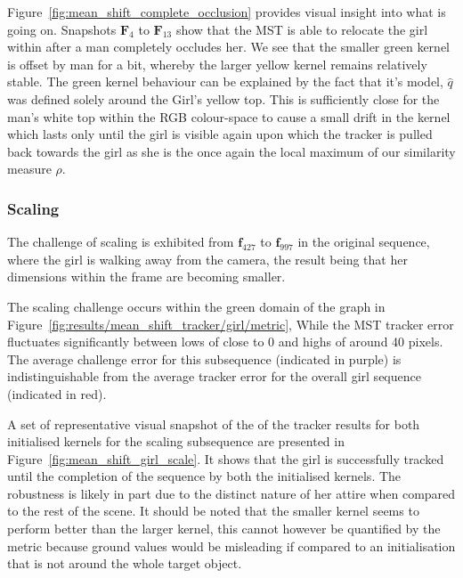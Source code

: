 Figure~\ref{fig:mean_shift_complete_occlusion} provides visual insight into
what is going on. Snapshots $\mathbf{F}_4$ to $\mathbf{F}_{13}$ show that the
MST is able to relocate the girl within after a man completely occludes her. We
see that the smaller green kernel is offset by man for a bit, whereby the larger
yellow kernel remains relatively stable. The green kernel behaviour can be
explained by the fact that it's model, $\hat{q}$ was defined solely around the
Girl's yellow top. This is sufficiently close for the man's white top within the
RGB colour-space to cause a small drift in the kernel which lasts only until the
girl is visible again upon which the tracker is pulled back towards the girl as
she is the once again the local maximum of our similarity measure $\rho$.

\subsubsection{Scaling}
The challenge of scaling is exhibited from $\mathbf{f}_{427}$ to
$\mathbf{f}_{997}$ in the original sequence, where the girl is walking away from
the camera, the result being that her dimensions within the frame are becoming
smaller.

The scaling challenge occurs within the green domain of the graph in
Figure~\ref{fig:results/mean_shift_tracker/girl/metric}, 
While the MST tracker error fluctuates significantly between lows of close to 0
and highs of around 40 pixels. The average challenge error for this subsequence
(indicated in purple) is indistinguishable from the average tracker error for the overall girl
sequence (indicated in red).

A set of representative visual snapshot of the of the tracker results for both initialised kernels
for the scaling subsequence are presented in
Figure~\ref{fig:mean_shift_girl_scale}. It shows that the girl is successfully
tracked until the completion of the sequence by both the initialised kernels.
The robustness is likely in part due to the distinct nature of her attire when
compared to the rest of the scene. It should be noted that the smaller kernel
seems to perform better than the larger kernel, this cannot however be
quantified by the metric because ground values would be misleading if compared
to an initialisation that is not around the whole target object.

